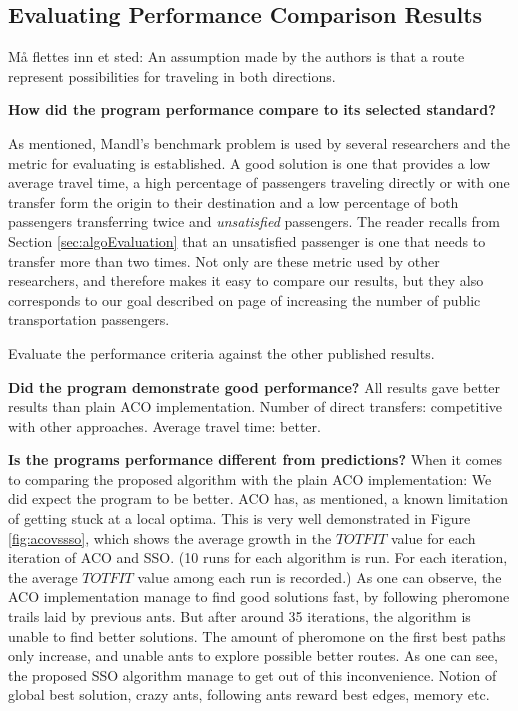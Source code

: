 \subsection{Evaluating Performance Comparison Results}

Må flettes inn et sted: An assumption made by the authors is that a route represent possibilities for traveling in both directions.

\textbf{How did the program performance compare to its selected standard?} 

As mentioned, Mandl's benchmark problem is used by several researchers and the metric for evaluating is established. A good solution is one that provides a low average travel time, a high percentage of passengers traveling directly or with one transfer form the origin to their destination and a low percentage of both passengers transferring twice and \textit{unsatisfied} passengers. The reader recalls from Section \vref{sec:algoEvaluation} that an unsatisfied passenger is one that needs to transfer more than two times. Not only are these metric used by other researchers, and therefore makes it easy to compare our results, but they also corresponds to our goal described on page \pageref{itm:goal} of increasing  the number of public transportation passengers. 

Evaluate the performance criteria against the other published results. 

\textbf{Did the program demonstrate good performance?}
All results gave better results than plain ACO implementation.
Number of direct transfers: competitive with other approaches. Average travel time: better. 

\textbf{Is the programs performance different from predictions?} When it comes to comparing the proposed algorithm with the plain ACO implementation: We did expect the program to be better. ACO has, as mentioned, a known limitation of getting stuck at a local optima. This is very well demonstrated in Figure \ref{fig:acovssso}, which shows the average growth in the $TOTFIT$ value for each iteration of ACO and SSO. (10 runs for each algorithm is run. For each iteration, the average $TOTFIT$ value among each run is recorded.) As one can observe, the ACO implementation manage to find good solutions fast, by following pheromone trails laid by previous ants. But after around 35 iterations, the algorithm is unable to find better solutions. The amount of pheromone on the first best paths only increase, and unable ants to explore possible better routes. As one can see, the proposed SSO algorithm manage to get out of this inconvenience. Notion of global best solution, crazy ants, following ants reward best edges, memory etc.


